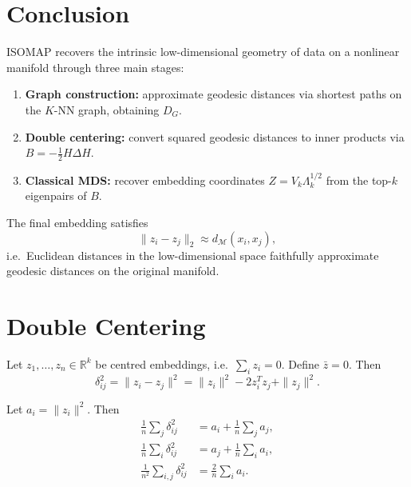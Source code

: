 \documentclass[11pt]{article}
\begin{document}
\section*{Conclusion}

ISOMAP recovers the intrinsic low-dimensional geometry of data on a nonlinear
manifold through three main stages:

\begin{enumerate}
  \item \textbf{Graph construction:} approximate geodesic distances via shortest
        paths on the $K$-NN graph, obtaining $D_G$.
  \item \textbf{Double centering:} convert squared geodesic distances to inner
        products via $B = -\tfrac{1}{2}H\Delta H$.
  \item \textbf{Classical MDS:} recover embedding coordinates
        $Z = V_k\Lambda_k^{1/2}$ from the top-$k$ eigenpairs of $B$.
\end{enumerate}

The final embedding satisfies
\[
  \|z_i - z_j\|_2 \approx d_{\mathcal{M}}(x_i, x_j),
\]
i.e.\ Euclidean distances in the low-dimensional space faithfully approximate
geodesic distances on the original manifold.

\begin{center}
\end{center}

\appendix
\section{Double Centering}
\label{app:doublecenter}

Let $z_1, \dots, z_n \in \mathbb{R}^k$ be centred embeddings, i.e.\
$\sum_i z_i = 0$. Define $\bar{z} = 0$. Then
\[
  \delta_{ij}^2 = \|z_i - z_j\|^2 = \|z_i\|^2 - 2z_i^T z_j + \|z_j\|^2.
\]

Let $a_i = \|z_i\|^2$. Then
\begin{align*}
  \frac{1}{n}\sum_j \delta_{ij}^2 &= a_i + \frac{1}{n}\sum_j a_j, \\
  \frac{1}{n}\sum_i \delta_{ij}^2 &= a_j + \frac{1}{n}\sum_i a_i, \\
  \frac{1}{n^2}\sum_{i,j} \delta_{ij}^2 &= \frac{2}{n}\sum_i a_i.
\end{align*}
\end{document}
